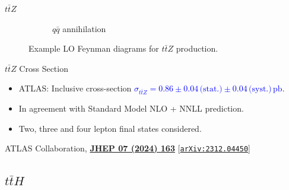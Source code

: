 \documentclass{beamer}
\begin{document}
\begin{frame}{$t\bar{t}Z$}
\begin{figure}[htbp]
\begin{subfigure}[b]{0.33\textwidth}
{
      }
      \caption{$q\bar{q}$ annihilation}
    \end{subfigure}
    \caption{Example LO Feynman diagrams for $t\bar{t}Z$ production.}
  \end{figure}
\end{frame}

\begin{frame}{$t\bar{t}Z$ Cross Section}
  \begin{itemize}
    \item ATLAS: Inclusive cross-section \textcolor{blue}{$\sigma_{t\bar{t}Z} = 0.86 \pm 0.04\,\text{(stat.)} \allowbreak \pm 0.04\,\text{(syst.)}\,\unit{\pico\barn}$}.
    \item In agreement with Standard Model NLO + NNLL prediction.
    \item Two, three and four lepton final states considered.
  \end{itemize}
  {\tiny \color{gray} ATLAS Collaboration, \textbf{\href{https://doi.org/10.1007/JHEP07(2024)163}{JHEP 07 (2024) 163}} [\href{https://arxiv.org/abs/2312.04450v3}{\texttt{arXiv:2312.04450}}]}
\end{frame}

\subsection{$t\bar{t}H$}
\end{document}
